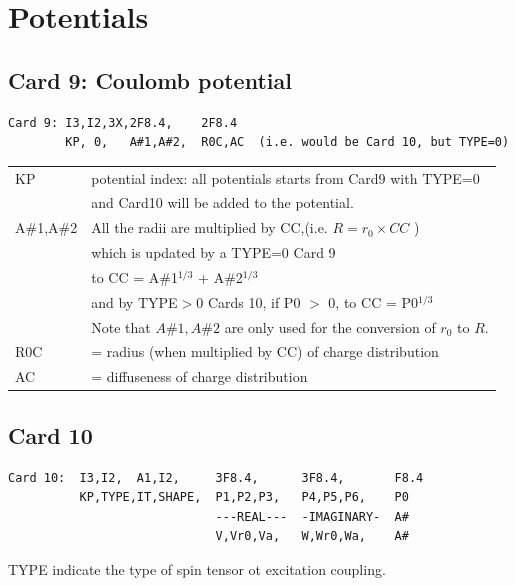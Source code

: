 \documentclass[11pt]{book}
\begin{document}
 
\newpage



\section{Potentials}
\subsection{Card 9: Coulomb potential} 
\begin{verbatim}
Card 9: I3,I2,3X,2F8.4,    2F8.4
        KP, 0,   A#1,A#2,  R0C,AC  (i.e. would be Card 10, but TYPE=0)
\end{verbatim}

\begin{table}[h]
\begin{tabular}{|l|l|}
\hline 
KP & potential index: all potentials starts from Card9 with TYPE=0  \\
   &    and Card10 will be added to the potential. \\
A\#1,A\#2 & All the radii are multiplied by CC,(i.e. $R=r_0\times CC$ )\\
   &    which is updated by a TYPE=0 Card 9 \\
   &    to CC = A\#1$^{1/3}$ + A\#2$^{1/3}$ \\
   &    and by TYPE$>$0 Cards 10, if P0 $>$ 0,  to CC = P0$^{1/3}$     \\
   & Note that $A\#1,A\#2$ are only used for the conversion of $r_0$ to $R$. \\
R0C & = radius (when multiplied by CC) of charge distribution  \\
AC  & = diffuseness of charge distribution \\
\hline 
\end{tabular}
\end{table}

\subsection{Card 10}
\begin{verbatim}
Card 10:  I3,I2,  A1,I2,     3F8.4,      3F8.4,       F8.4
          KP,TYPE,IT,SHAPE,  P1,P2,P3,   P4,P5,P6,    P0
                             ---REAL---  -IMAGINARY-  A#
                             V,Vr0,Va,   W,Wr0,Wa,    A#
\end{verbatim}

TYPE indicate the type of spin tensor ot excitation coupling. 
\end{document}
